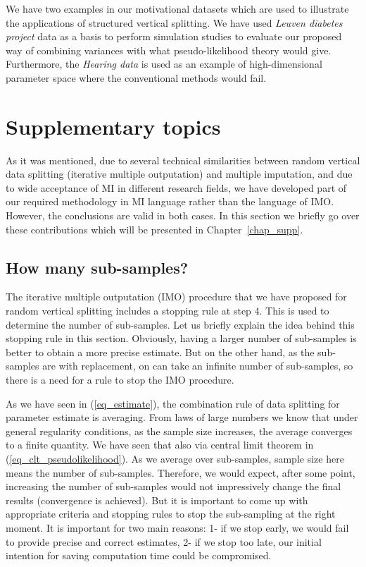 \documentclass[11pt,a5paper,twoside]{book}
\begin{document}
We have two examples in our motivational datasets which are used to illustrate the applications of structured vertical splitting. We have used \emph{Leuven diabetes project} data as a basis to perform simulation studies to evaluate our proposed way of combining variances with what pseudo-likelihood theory would give. Furthermore, the \emph{Hearing data} is used as an example of high-dimensional parameter space where the conventional methods would fail. 




\section{Supplementary topics}

As it was mentioned, due to several technical similarities between random vertical data splitting (iterative multiple outputation) and multiple imputation, and due to wide acceptance of MI in different research fields, we have developed part of our required methodology in MI language rather than the language of IMO. However, the conclusions are valid in both cases. In this section we briefly go over these contributions which will be presented in Chapter~\ref{chap_supp}.

\subsection{How many sub-samples?}

The iterative multiple outputation (IMO) procedure that we have proposed for random vertical splitting includes a stopping rule at step 4. This is used to determine the number of sub-samples. Let us briefly explain the idea behind this stopping rule in this section. Obviously, having a larger number of sub-samples is better to obtain a more precise estimate. But on the other hand, as the sub-samples are with replacement, on can take an infinite number of sub-samples, so there is a need for a rule to stop the IMO procedure. 

As we have seen in (\ref{eq_estimate}), the combination rule of data splitting for parameter estimate is averaging. From laws of large numbers we know that under general regularity conditions, as the sample size increases, the average converges to a finite quantity. We have seen that also via central limit theorem in (\ref{eq_clt_pseudolikelihood}). As we average over sub-samples, sample size here means the number of sub-samples. Therefore, we would expect, after some point, increasing the number of sub-samples would not impressively change the final results (convergence is achieved). But it is important to come up with appropriate criteria and stopping rules to stop the sub-sampling at the right moment. It is important for two main reasons: 1- if we stop early, we would fail to provide precise and correct estimates, 2- if we stop too late, our initial intention for saving computation time could be compromised.
\end{document}
